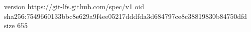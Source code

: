 version https://git-lfs.github.com/spec/v1
oid sha256:7549660133bbc8e629a9f4ee05217dddfda3d684797ce8c38819830b84750dfd
size 655
